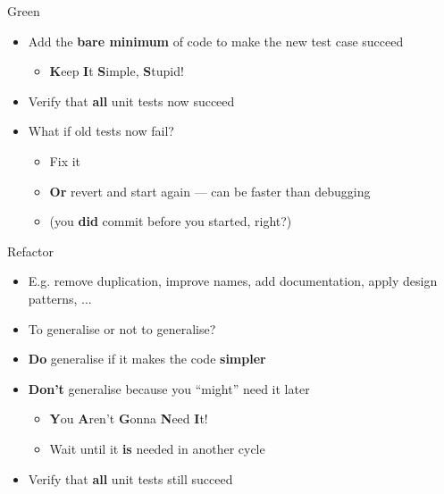 \begin{frame}{Green}
    \begin{itemize}
        \item Add the \textbf{bare minimum} of code to make the new test case succeed \pause
            \begin{itemize}
                \item \textbf{K}eep \textbf{I}t \textbf{S}imple, \textbf{S}tupid! \pause
            \end{itemize}
        \item Verify that \textbf{all} unit tests now succeed \pause
        \item What if old tests now fail? \pause
            \begin{itemize}
                \item Fix it \pause
                \item \textbf{Or} revert and start again --- can be faster than debugging \pause
                \item (you \textbf{did} commit before you started, right?)
            \end{itemize}
    \end{itemize}
\end{frame}

\begin{frame}{Refactor}
    \begin{itemize}
        \item E.g. remove duplication, improve names, add documentation, apply design patterns, ... \pause
        \item To generalise or not to generalise? \pause
        \item \textbf{Do} generalise if it makes the code \textbf{simpler} \pause
        \item \textbf{Don't} generalise because you ``might'' need it later \pause
            \begin{itemize}
                \item \textbf{Y}ou \textbf{A}ren't \textbf{G}onna \textbf{N}eed \textbf{I}t!
                \item Wait until it \textbf{is} needed in another cycle \pause
            \end{itemize}
        \item Verify that \textbf{all} unit tests still succeed
    \end{itemize}
\end{frame}

